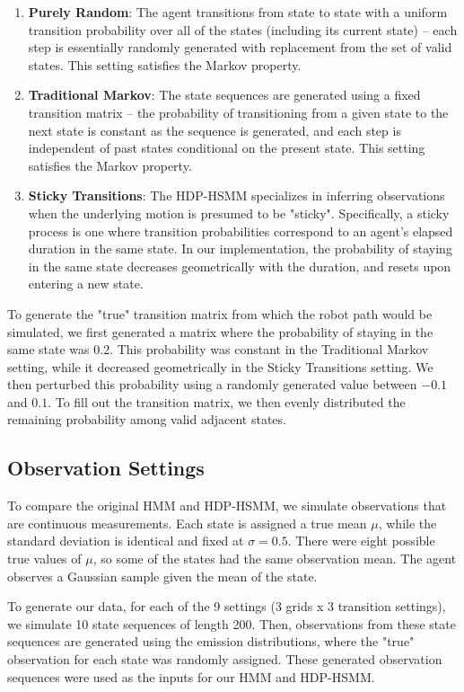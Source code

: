 \documentclass{article}
\begin{document}
\begin{enumerate}
	\item \textbf{Purely Random}: The agent transitions from state to state with a uniform transition probability over all of the states (including its current state) -- each step is essentially randomly generated with replacement from the set of valid states. This setting satisfies the Markov property.
	\item \textbf{Traditional Markov}: The state sequences are generated using a fixed transition matrix -- the probability of transitioning from a given state to the next state is constant as the sequence is generated, and each step is independent of past states conditional on the present state. This setting satisfies the Markov property.
	\item \textbf{Sticky Transitions}: The HDP-HSMM specializes in inferring observations when the underlying motion is presumed to be "sticky". Specifically, a sticky process is one where transition probabilities correspond to an agent's elapsed duration in the same state. In our implementation, the probability of staying in the same state decreases geometrically with the duration, and resets upon entering a new state.
 \end{enumerate}

To generate the "true" transition matrix from which the robot path would be simulated, we first generated a matrix where the probability of staying in the same state was $0.2$. This probability was constant in the Traditional Markov setting, while it decreased geometrically in the Sticky Transitions setting. We then perturbed this probability using a randomly generated value between $-0.1$ and $0.1$. To fill out the transition matrix, we then evenly distributed the remaining probability among valid adjacent states.

\subsection{Observation Settings}

To compare the original HMM and HDP-HSMM, we simulate observations that are continuous measurements. Each state is assigned a true mean $\mu$, while the standard deviation is identical and fixed at $\sigma = 0.5$. There were eight possible true values of $\mu$, so some of the states had the same observation mean. The agent observes a Gaussian sample given the mean of the state.

To generate our data, for each of the 9 settings (3 grids x 3 transition settings), we simulate 10 state sequences of length 200. Then, observations from these state sequences are generated using the emission distributions, where the "true" observation for each state was randomly assigned. These generated observation sequences were used as the inputs for our HMM and HDP-HSMM.
\end{document}
